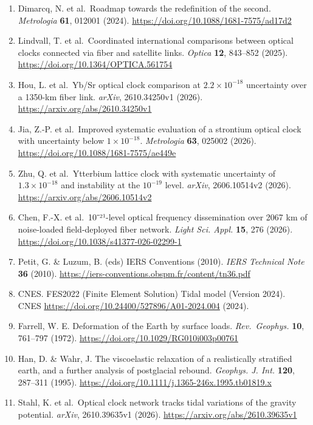 \documentclass[
  12pt,
  a4paper,
]{article}
\begin{document}
\begin{enumerate}
  \url{https://doi.org/10.1038/s41567-017-0042-3}
\item
  Dimarcq, N. et al.~Roadmap towards the redefinition of the second.
  \emph{Metrologia} \textbf{61}, 012001 (2024).
  \url{https://doi.org/10.1088/1681-7575/ad17d2}
\item
  Lindvall, T. et al.~Coordinated international comparisons between
  optical clocks connected via fiber and satellite links. \emph{Optica}
  \textbf{12}, 843--852 (2025).
  \url{https://doi.org/10.1364/OPTICA.561754}
\item
  Hou, L. et al.~Yb/Sr optical clock comparison at \(2.2\times10^{-18}\)
  uncertainty over a 1350-km fiber link. \emph{arXiv}, 2610.34250v1
  (2026). \url{https://arxiv.org/abs/2610.34250v1}
\item
  Jia, Z.-P. et al.~Improved systematic evaluation of a strontium
  optical clock with uncertainty below \(1\times10^{-18}\).
  \emph{Metrologia} \textbf{63}, 025002 (2026).
  \url{https://doi.org/10.1088/1681-7575/ae449e}
\item
  Zhu, Q. et al.~Ytterbium lattice clock with systematic uncertainty of
  \(1.3\times 10^{-18}\) and instability at the \(10^{-19}\) level.
  \emph{arXiv}, 2606.10514v2 (2026).
  \url{https://arxiv.org/abs/2606.10514v2}
\item
  Chen, F.-X. et al.~10⁻²¹-level optical frequency dissemination over
  2067 km of noise-loaded field-deployed fiber network. \emph{Light Sci.
  Appl.} \textbf{15}, 276 (2026).
  \url{https://doi.org/10.1038/s41377-026-02299-1}
\item
  Petit, G. \& Luzum, B. (eds) IERS Conventions (2010). \emph{IERS
  Technical Note} \textbf{36} (2010).
  \url{https://iers-conventions.obspm.fr/content/tn36.pdf}
\item
  CNES. FES2022 (Finite Element Solution) Tidal model (Version 2024).
  CNES \url{https://doi.org/10.24400/527896/A01-2024.004} (2024).
\item
  Farrell, W. E. Deformation of the Earth by surface loads.
  \emph{Rev.~Geophys.} \textbf{10}, 761--797 (1972).
  \url{https://doi.org/10.1029/RG010i003p00761}
\item
  Han, D. \& Wahr, J. The viscoelastic relaxation of a realistically
  stratified earth, and a further analysis of postglacial rebound.
  \emph{Geophys. J. Int.} \textbf{120}, 287--311 (1995).
  \url{https://doi.org/10.1111/j.1365-246x.1995.tb01819.x}
\item
  Stahl, K. et al.~Optical clock network tracks tidal variations of the
  gravity potential. \emph{arXiv}, 2610.39635v1 (2026).
  \url{https://arxiv.org/abs/2610.39635v1}
\end{enumerate}
\end{document}
